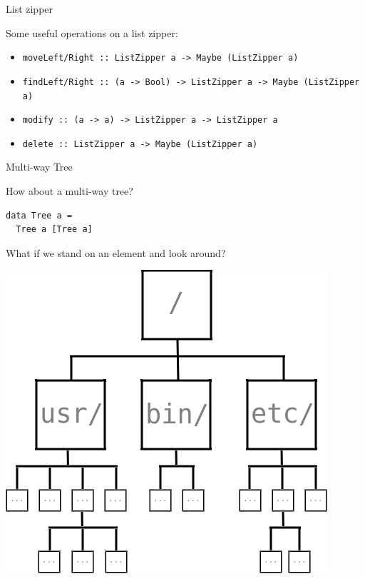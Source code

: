 \begin{frame}[fragile]
\begin{block}{List zipper}
\begin{center}
Some useful operations on a list zipper:
\begin{itemize}
  \item<1-> \tiny{\lstinline{moveLeft/Right :: ListZipper a -> Maybe (ListZipper a)}}
  \item<2-> \tiny{\lstinline{findLeft/Right :: (a -> Bool) -> ListZipper a -> Maybe (ListZipper a)}}
  \item<3-> \tiny{\lstinline{modify :: (a -> a) -> ListZipper a -> ListZipper a}}
  \item<4-> \tiny{\lstinline{delete :: ListZipper a -> Maybe (ListZipper a)}}
\end{itemize}
\end{center}
\end{block}
\end{frame}

\begin{frame}[fragile]
\begin{block}{Multi-way Tree}
\begin{center}
How about a multi-way tree?
\end{center}
\end{block}
\begin{center}
\begin{lstlisting}[style=haskell]
data Tree a =
  Tree a [Tree a]
\end{lstlisting}
\end{center}
\end{frame}

\begin{frame}[fragile]
\begin{block}{What if we stand on an element and look around?}
\begin{center}
\includegraphics[width=0.60\textheight]{image/rosetree.png}
\end{center}
\end{block}
\end{frame}

